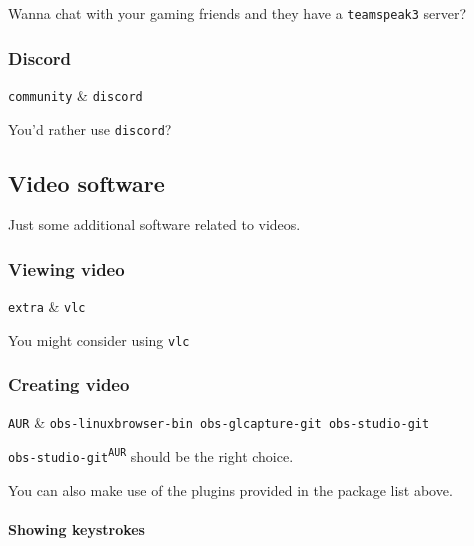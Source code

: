 \documentclass[10pt]{dustdoc}
\begin{document}
Wanna chat with your gaming friends and they have a \texttt{teamspeak3} server?

\subsubsection{Discord}
\label{sec:discord}

\begin{packagetable}
    \texttt{community} & \texttt{discord} \\ 
\end{packagetable}

You’d rather use \texttt{discord}?

\subsection{Video software}
\label{sec:gui-video-software}

Just some additional software related to videos.

\subsubsection{Viewing video}
\label{sec:viewing-video}

\begin{packagetable}
    \texttt{extra} & \texttt{vlc} \\ 
\end{packagetable}

You might consider using \texttt{vlc}

\subsubsection{Creating video}
\label{sec:creating-video}

\begin{packagetable}
    \texttt{AUR} & \texttt{obs-linuxbrowser-bin obs-glcapture-git obs-studio-git} \\ 
\end{packagetable}

\texttt{obs-studio-git\textsuperscript{\texttt{AUR}}} should be the right choice.

You can also make use of the plugins provided in the package list above.

\paragraph{Showing keystrokes}
\label{par:showing-keystrokes}
\end{document}
